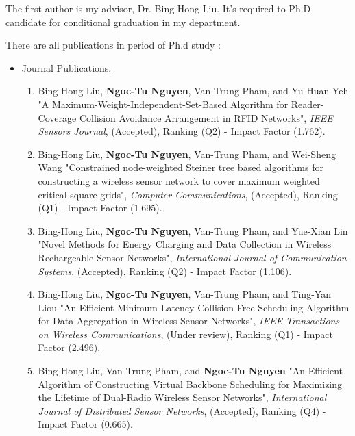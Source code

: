 
\begin{publication}

\begin{center}
{\color{red}The first author is my advisor, Dr. Bing-Hong Liu. It's required to Ph.D candidate for conditional graduation in my department.}
\end{center}

\noindent There are all publications in period of Ph.d study :

\begin{itemize}
\item {\color{blue}Journal Publications}.
    \begin{enumerate}
        \item Bing-Hong Liu, \textbf{Ngoc-Tu Nguyen}, Van-Trung Pham, and Yu-Huan Yeh
		"A Maximum-Weight-Independent-Set-Based Algorithm for Reader-Coverage Collision Avoidance Arrangement in RFID Networks", \emph{IEEE Sensors Journal}, (Accepted), Ranking (Q2) - Impact Factor (1.762).

        \item Bing-Hong Liu, \textbf{Ngoc-Tu Nguyen}, Van-Trung Pham, and Wei-Sheng Wang
		"Constrained node-weighted Steiner tree based algorithms for constructing a wireless
		sensor network to cover maximum weighted critical square grids",
		\emph{Computer Communications}, (Accepted), Ranking (Q1) - Impact Factor (1.695).

        \item Bing-Hong Liu, \textbf{Ngoc-Tu Nguyen}, Van-Trung Pham, and Yue-Xian Lin
		"Novel Methods for Energy Charging and Data Collection in Wireless Rechargeable Sensor Networks",
		\emph{International Journal of Communication Systems}, (Accepted), Ranking (Q2) - Impact Factor (1.106).

        \item Bing-Hong Liu, \textbf{Ngoc-Tu Nguyen}, Van-Trung Pham, and Ting-Yan Liou
		"An Efficient Minimum-Latency Collision-Free Scheduling Algorithm for Data Aggregation in Wireless Sensor Networks",
		\emph{IEEE Transactions on Wireless Communications}, (Under review), Ranking (Q1) - Impact Factor (2.496).

        \item Bing-Hong Liu, Van-Trung Pham, and \textbf{Ngoc-Tu Nguyen}
		"An Efficient Algorithm of Constructing Virtual Backbone Scheduling for Maximizing the Lifetime of Dual-Radio Wireless Sensor Networks", \emph{International Journal of Distributed Sensor Networks}, (Accepted), Ranking (Q4) - Impact Factor (0.665).


\end{enumerate}
\end{itemize}
\end{publication}
